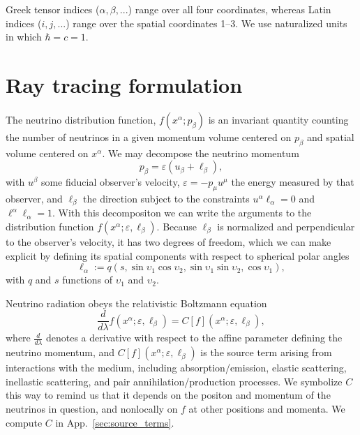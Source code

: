 \documentclass[aps,prd,twocolumn,superscriptaddress,groupedaddress]{revtex4}
\begin{document}
Greek tensor indices ($\alpha, \beta, ...$) range over all four coordinates,
whereas Latin indices ($i, j, ...$) range over the spatial coordinates 1--3.
We use naturalized units in which $\hbar=c=1$.

\section{Ray tracing formulation}
\label{sec:formulation}
The neutrino distribution function, $f(x^\alpha; p_\beta)$ is an invariant
quantity counting the number of neutrinos in a given momentum volume centered on
$p_\beta$ and spatial volume centered on $x^\alpha$.
We may decompose the neutrino momentum
\begin{equation}
  \label{eqn:def_momentum}
  p_\beta = \varepsilon (u_\beta + \ell_\beta),
\end{equation}
with $u^\beta$ some fiducial observer's velocity,
$\varepsilon=-p_\mu u^\mu$ the energy measured by that observer,
and $\ell_\beta$ the direction subject to the constraints
$u^\alpha \ell_\alpha = 0$ and
$\ell^\alpha \ell_\alpha=1$.
With this decompositon we can write the arguments to the distribution function
$f(x^\alpha;\varepsilon,\ell_\beta)$.
Because $\ell_\beta$ is normalized and perpendicular to the observer's velocity,
it has two degrees of freedom, which we can make explicit by defining its
spatial components with respect to spherical polar angles
\begin{equation}
  \label{eq:def_direction}
  \ell_\alpha :=
  q (s,\sin\upsilon_1\cos\upsilon_2,\sin\upsilon_1\sin\upsilon_2,\cos\upsilon_1),
\end{equation}
with $q$ and $s$ functions of $\upsilon_1$ and $\upsilon_2$.

Neutrino radiation obeys the relativistic Boltzmann equation
\begin{equation}
  \label{eqn:boltzmann}
  \frac{d}{d\lambda}f(x^\alpha;\varepsilon,\ell_\beta) =
  C[f](x^\alpha;\varepsilon,\ell_\beta),
\end{equation}
where $\frac{d}{d\lambda}$ denotes a derivative with respect to the affine
parameter defining the neutrino momentum,
and $C[f](x^\alpha;\varepsilon,\ell_\beta)$
is the source term arising from interactions with the medium,
including absorption/emission, elastic scattering, inellastic scattering,
and pair annihilation/production processes.
We symbolize $C$ this way to remind us that it depends on the positon and
momentum of the neutrinos in question, and nonlocally on $f$ at other positions
and momenta.
We compute $C$ in App.~\ref{sec:source_terms}.
\end{document}
